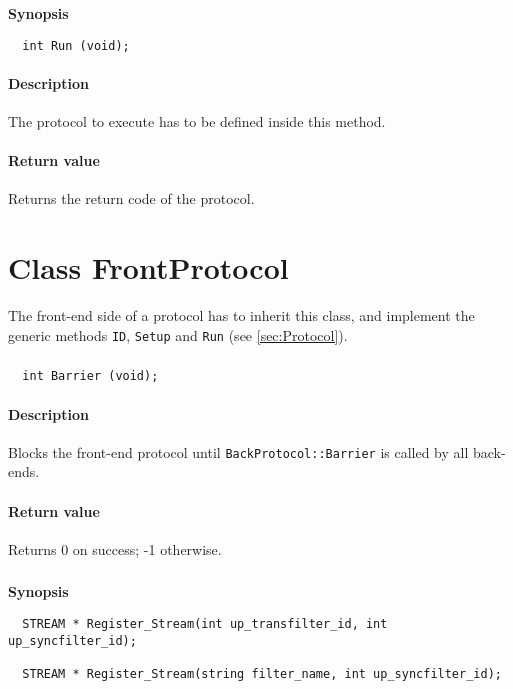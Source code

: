 \documentclass[twoside,a4,english,11pt]{book}
\begin{document}
\textbf{Synopsis}
\begin{lstlisting}
  int Run (void);
\end{lstlisting}
  
\paragraph{Description}
  The protocol to execute has to be defined inside this method.
  
\paragraph{Return value}
  Returns the return code of the protocol.


\section{Class FrontProtocol}
  The front-end side of a protocol has to inherit this class, and implement the generic methods \texttt{ID}, \texttt{Setup} and \texttt{Run}
  (see \ref{sec:Protocol}). 

\subsubsection{}
\begin{lstlisting}
  int Barrier (void);
\end{lstlisting}

\paragraph{Description}
  Blocks the front-end protocol until \texttt{BackProtocol::Barrier} is called by all back-ends.
  
\paragraph{Return value}
  Returns 0 on success; -1 otherwise.

\subsubsection{}

\textbf{Synopsis}
\begin{lstlisting}
  STREAM * Register_Stream(int up_transfilter_id, int up_syncfilter_id);

  STREAM * Register_Stream(string filter_name, int up_syncfilter_id);
\end{lstlisting}
\end{document}
